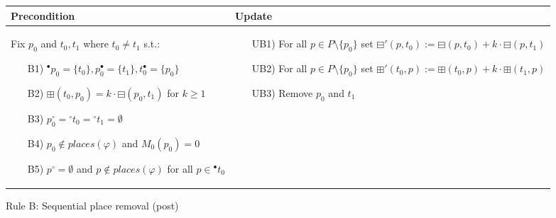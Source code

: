 \begin{figure}[h]
    \begin{adjustbox}{center}
        \begin{tabular}{|p{70mm}|p{62mm}|} \hline
        Precondition & Update \\ \hline
        Fix $p_0$ and $t_0,t_1$ where $t_0\neq t_1$ s.t.:
        \begin{itemize}[leftmargin=10mm]
            \item[B1)] ${}^\bullet p_0=\{t_0\}, p_0^\bullet=\{t_1\},t_0^\bullet=\{p_0\}$
            \item[B2)] $\boxplus(t_0,p_0)=k\cdot\boxminus(p_0, t_1)$ for $k\geq 1$
            \item[B3)] $p_0^\circ ={}^\circ t_0={}^\circ t_1=\emptyset$
            \item[B4)] $p_0\notin places(\varphi)$ and $M_0(p_0)=0$
            \item[B5)] $p^\circ =\emptyset$ and $p\notin places(\varphi)$ for all $p\in{}^\bullet t_0$
        \end{itemize} &
        \begin{itemize}[leftmargin=10mm]
            \item[UB1)] For all $p\in P\setminus\{p_0\}$ set $\boxminus'(p,t_0):=\boxminus(p,t_0)+k\cdot\boxminus(p,t_1)$
            \item[UB2)] For all $p\in P\setminus\{p_0\}$ set $\boxplus'(t_0,p):=\boxplus(t_0,p)+k\cdot\boxplus(t_1,p)$
            \item[UB3)] Remove $p_0$ and $t_1$
        \end{itemize} \\ \hline
        \end{tabular}
    \end{adjustbox}
    \caption{Rule B: Sequential place removal (post)}
    \label{fig:rule_b_post}
\end{figure}